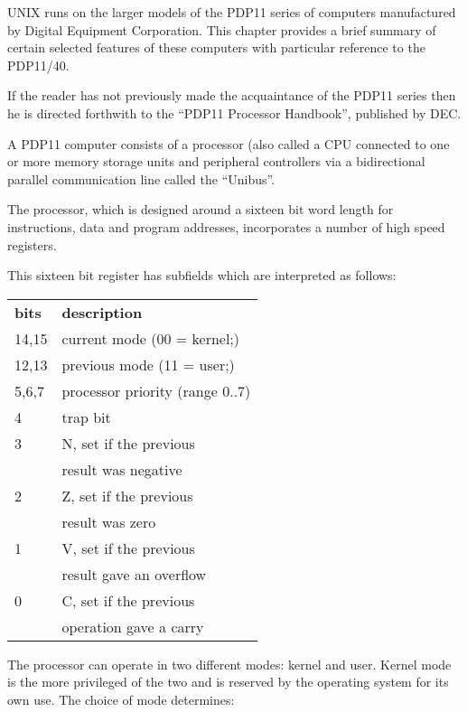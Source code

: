 %
%

UNIX runs on the larger models of the
PDP11 series of computers manufactured
by Digital Equipment Corporation. This
chapter provides a brief summary of
certain selected features of these computers
with particular reference to the
PDP11/40.

If the reader has not previously made
the acquaintance of the PDP11 series
then he is directed forthwith to the
``PDP11 Processor Handbook'', published
by DEC.

A PDP11 computer consists of a processor
(also called a CPU connected to
one or more memory storage units and
peripheral controllers via a bidirectional
parallel communication line
called the ``Unibus''.


The processor, which is designed around a
sixteen bit word length for instructions,
data and program addresses, incorporates
a number of high speed registers.


This sixteen bit register has subfields
which are interpreted as follows:

\begin{tabular}{ll}\\
{\bf bits} & {\bf description} \\
14,15 & current mode (00 = kernel;) \\
12,13 & previous mode (11 = user;) \\
5,6,7 & processor priority (range 0..7) \\
4 & trap bit \\
3 & N, set if the previous \\
  & result was negative \\
2 & Z, set if the previous \\
  & result was zero \\
1 & V, set if the previous \\
  & result gave an overflow \\
0 & C, set if the previous \\
  & operation gave a carry \\
\end{tabular}

The processor can operate in two different
modes: kernel and user. Kernel
mode is the more privileged of the two
and is reserved by the operating system
for its own use. The choice of mode
determines:

